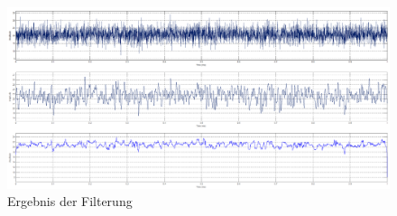 \begin{figure} [h]
         \centering
         \caption{ Ergebnis der Filterung  }
         \label{fig:FIR_Filter_output}
         \includegraphics[width=1\textwidth]{common/img/AmpGefiltert_small.png}
%
\end{figure}
